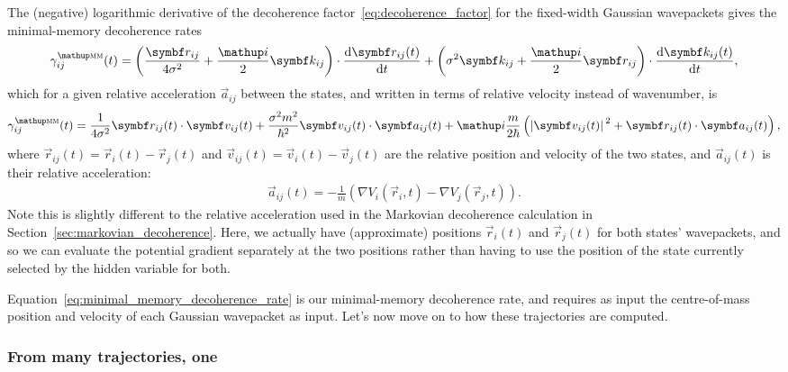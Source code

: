 The (negative) logarithmic derivative of the decoherence factor~\eqref{eq:decoherence_factor} for the fixed-width Gaussian wavepackets gives the minimal-memory decoherence rates
\begin{align}
\gamma^\up{\textsc{mm}}_{ij}(t) = \left(
\frac{\vec r_{ij}}{4\sigma^2} + \frac\ii2\vec k_{ij}
\right)\cdot\dv{\vec r_{ij}(t)}{t}
+ \left(
\sigma^2\vec k_{ij} + \frac\ii2\vec r_{ij}
\right)\cdot\dv{\vec k_{ij}(t)}{t},
\end{align}
which for a given relative acceleration $\vec a_{ij}$ between the states, and written in terms of relative velocity instead of wavenumber, is
\begin{align}\label{eq:mm_decoherence_rate}
\gamma^\up{\textsc{mm}}_{ij}(t) = 
\frac{1}{4\sigma^2}\vec r_{ij}(t)\cdot\vec v_{ij}(t)
+ \frac{\sigma^2 m^2}{\hbar^2}\vec v_{ij}(t)\cdot\vec a_{ij}(t)
+ \ii\frac{m} {2\hbar} \left(\abs{\vec v_{ij}(t)}^2 + \vec r_{ij}(t)\cdot \vec a_{ij}(t)\right),
\end{align}\label{eq:minimal_memory_decoherence_rate}
where $\vec r_{ij}(t) = \vec r_i(t) - \vec r_j(t)$ and $\vec v_{ij}(t) = \vec v_i(t) - \vec v_j(t)$ are the relative position and velocity of the two states, and $\vec a_{ij}(t)$ is their relative acceleration:
\begin{align}
\vec a_{ij}(t) = -\frac1 m\left(\nabla V_i(\vec r_i, t) - \nabla V_j(\vec r_j, t)\right).
\end{align}
Note this is slightly different to the relative acceleration used in the Markovian decoherence calculation in Section~\ref{sec:markovian_decoherence}. Here, we actually have (approximate) positions $\vec r_i(t)$ and $\vec r_j(t)$ for both states' wavepackets, and so we can evaluate the potential gradient separately at the two positions rather than having to use the position of the state currently selected by the hidden variable for both.

Equation~\eqref{eq:minimal_memory_decoherence_rate} is our minimal-memory decoherence rate, and requires as input the centre-of-mass position and velocity of each Gaussian wavepacket as input. Let's now move on to how these trajectories are computed.

\subsubsection{From many trajectories, one}

